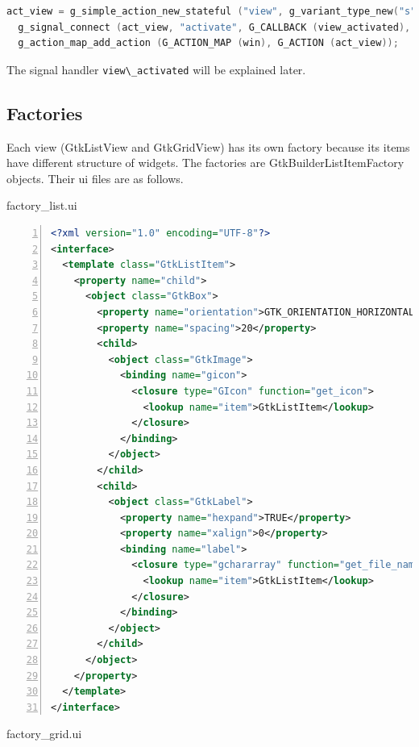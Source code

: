 \begin{lstlisting}[language=C]
  act_view = g_simple_action_new_stateful ("view", g_variant_type_new("s"), g_variant_new_string ("list"));
  g_signal_connect (act_view, "activate", G_CALLBACK (view_activated), scr); /* scr is the GtkScrolledWindow object */
  g_action_map_add_action (G_ACTION_MAP (win), G_ACTION (act_view));
\end{lstlisting}

The signal handler \passthrough{\lstinline!view\_activated!} will be
explained later.

\hypertarget{factories}{%
\subsection{Factories}\label{factories}}

Each view (GtkListView and GtkGridView) has its own factory because its
items have different structure of widgets. The factories are
GtkBuilderListItemFactory objects. Their ui files are as follows.

factory\_list.ui

\begin{lstlisting}[language=XML, numbers=left]
<?xml version="1.0" encoding="UTF-8"?>
<interface>
  <template class="GtkListItem">
    <property name="child">
      <object class="GtkBox">
        <property name="orientation">GTK_ORIENTATION_HORIZONTAL</property>
        <property name="spacing">20</property>
        <child>
          <object class="GtkImage">
            <binding name="gicon">
              <closure type="GIcon" function="get_icon">
                <lookup name="item">GtkListItem</lookup>
              </closure>
            </binding>
          </object>
        </child>
        <child>
          <object class="GtkLabel">
            <property name="hexpand">TRUE</property>
            <property name="xalign">0</property>
            <binding name="label">
              <closure type="gchararray" function="get_file_name">
                <lookup name="item">GtkListItem</lookup>
              </closure>
            </binding>
          </object>
        </child>
      </object>
    </property>
  </template>
</interface>
\end{lstlisting}

factory\_grid.ui


